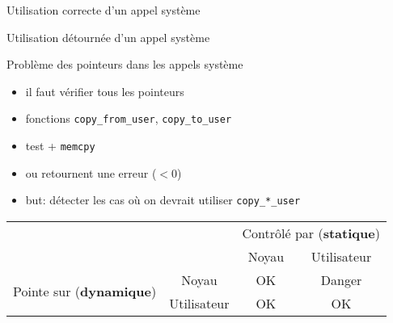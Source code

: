 \begin{frame}{Utilisation correcte d'un appel système}
\centering

\end{frame}

\begin{frame}{Utilisation détournée d'un appel système}
\centering

\end{frame}


\begin{frame}{Problème des pointeurs dans les appels système}



\begin{itemize}
    \item il faut vérifier tous les pointeurs
    \item fonctions \texttt{copy\_from\_user}, \texttt{copy\_to\_user}
    \item test + \texttt{memcpy}
    \item ou retournent une erreur ($< 0$)
    \item but: détecter les cas où on devrait utiliser \texttt{copy\_*\_user}
\end{itemize}

\begin{center}
\begin{tabular}{cccc}
    \toprule
    & & \multicolumn{2}{p{2cm}}{Contrôlé par \newline (\textbf{statique})} \\
    & & Noyau & Utilisateur \\
    \midrule
\multirow{2}{*}{\parbox{2cm}{Pointe sur \newline (\textbf{dynamique})}}
    & Noyau  & OK & Danger \\
    & Utilisateur & OK & OK \\
    \bottomrule
\end{tabular}
\end{center}

\end{frame}


